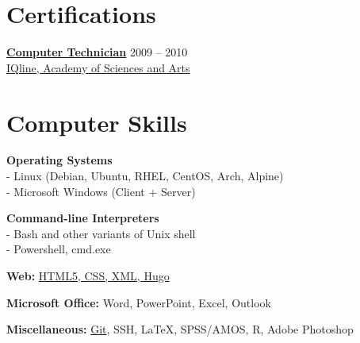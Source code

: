 \documentclass[
	12pt,a4paper %
]{article}
\newcommand{\tableentry}[3]{
	\textsc{#1} & #2\expandafter\ifstrequal\expandafter{#3}{}{\\}{\\[5pt]} %
}
\begin{document}
\begin{paracol}{2} %

\section{Certifications}

\href{https://loona-il.000webhostapp.com/resume-references/computer-technitian-certificate.jpg}{\textbf{Computer Technician}} \hfill 2009 -- 2010 \\
\href{https://loona-il.000webhostapp.com/resume-references/computer-technitian-certificate.jpg}{IQline, Academy of Sciences and Arts}

\section{Computer Skills}

\textbf{Operating Systems} \\
 - Linux (Debian, Ubuntu, RHEL, CentOS, Arch, Alpine)\\
 - Microsoft Windows (Client + Server)

\textbf{Command-line Interpreters} \\
- Bash and other variants of Unix shell \\
- Powershell, cmd.exe

\textbf{Web:} \href{https://kirilu.netlify.app/resume/}{HTML5, CSS, XML, Hugo}

\textbf{Microsoft Office:} Word, PowerPoint, Excel, Outlook

\textbf{Miscellaneous:} \href{https://github.com/jiwoo-il}{Git}, SSH, LaTeX, SPSS/AMOS, R, Adobe Photoshop






\end{paracol}
\end{document}
